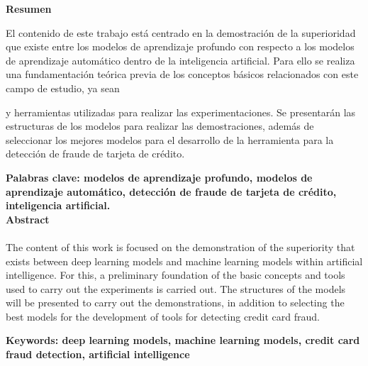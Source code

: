 \newpage
\textbf{\LARGE Resumen}

  El contenido de este trabajo est\'{a} centrado en la demostraci\'{o}n de la superioridad que existe entre los modelos de aprendizaje profundo con respecto a los modelos de aprendizaje autom\'{a}tico dentro de la inteligencia artificial. Para ello se realiza una fundamentaci\'{o}n te\'{o}rica previa de los conceptos b\'{a}sicos relacionados con este campo de estudio, ya sean
  
   y herramientas utilizadas para realizar las experimentaciones. Se presentar\'{a}n las estructuras de los modelos para realizar las demostraciones, adem\'{a}s de seleccionar los mejores modelos para el desarrollo de la herramienta para la detecci\'{o}n de fraude de tarjeta de cr\'{e}dito.
  
\textbf{\small Palabras clave: modelos de aprendizaje profundo, modelos de aprendizaje autom\'{a}tico, detecci\'{o}n de fraude de tarjeta de cr\'{e}dito, inteligencia artificial.}\\

\textbf{\LARGE Abstract}\\\\

The content of this work is focused on the demonstration of the superiority that exists between deep learning models and machine learning models within artificial intelligence. For this, a preliminary foundation of the basic concepts and tools used to carry out the experiments is carried out. The structures of the models will be presented to carry out the demonstrations, in addition to selecting the best models for the development of tools for detecting credit card fraud.

\textbf{\small Keywords: deep learning models, machine learning models, credit card fraud detection, artificial intelligence}\\